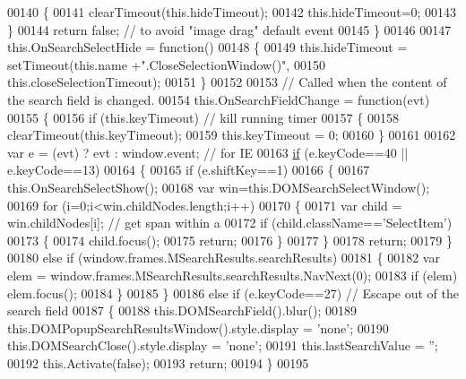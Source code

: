 \begin{DoxyCode}
00140     \{
00141       clearTimeout(this.hideTimeout);
00142       this.hideTimeout=0;
00143     \}
00144     \textcolor{keywordflow}{return} \textcolor{keyword}{false}; \textcolor{comment}{// to avoid "image drag" default event}
00145   \}
00146 
00147   this.OnSearchSelectHide = \textcolor{keyword}{function}()
00148   \{
00149     this.hideTimeout = setTimeout(this.name +\textcolor{stringliteral}{".CloseSelectionWindow()"},
00150                                   this.closeSelectionTimeout);
00151   \}
00152 
00153   \textcolor{comment}{// Called when the content of the search field is changed.}
00154   this.OnSearchFieldChange = \textcolor{keyword}{function}(evt)
00155   \{
00156     \textcolor{keywordflow}{if} (this.keyTimeout) \textcolor{comment}{// kill running timer}
00157     \{
00158       clearTimeout(this.keyTimeout);
00159       this.keyTimeout = 0;
00160     \}
00161 
00162     var e  = (evt) ? evt : window.event; \textcolor{comment}{// for IE}
00163     \hyperlink{jquery_8js_a9db6d45a025ad692282fe23e69eeba43}{if} (e.keyCode==40 || e.keyCode==13)
00164     \{
00165       \textcolor{keywordflow}{if} (e.shiftKey==1)
00166       \{
00167         this.OnSearchSelectShow();
00168         var win=this.DOMSearchSelectWindow();
00169         \textcolor{keywordflow}{for} (i=0;i<win.childNodes.length;i++)
00170         \{
00171           var child = win.childNodes[i]; \textcolor{comment}{// get span within a}
00172           \textcolor{keywordflow}{if} (child.className==\textcolor{stringliteral}{'SelectItem'})
00173           \{
00174             child.focus();
00175             \textcolor{keywordflow}{return};
00176           \}
00177         \}
00178         \textcolor{keywordflow}{return};
00179       \}
00180       \textcolor{keywordflow}{else} \textcolor{keywordflow}{if} (window.frames.MSearchResults.searchResults)
00181       \{
00182         var elem = window.frames.MSearchResults.searchResults.NavNext(0);
00183         \textcolor{keywordflow}{if} (elem) elem.focus();
00184       \}
00185     \}
00186     \textcolor{keywordflow}{else} \textcolor{keywordflow}{if} (e.keyCode==27) \textcolor{comment}{// Escape out of the search field}
00187     \{
00188       this.DOMSearchField().blur();
00189       this.DOMPopupSearchResultsWindow().style.display = \textcolor{stringliteral}{'none'};
00190       this.DOMSearchClose().style.display = \textcolor{stringliteral}{'none'};
00191       this.lastSearchValue = \textcolor{stringliteral}{''};
00192       this.Activate(\textcolor{keyword}{false});
00193       \textcolor{keywordflow}{return};
00194     \}
00195 

\end{DoxyCode}
